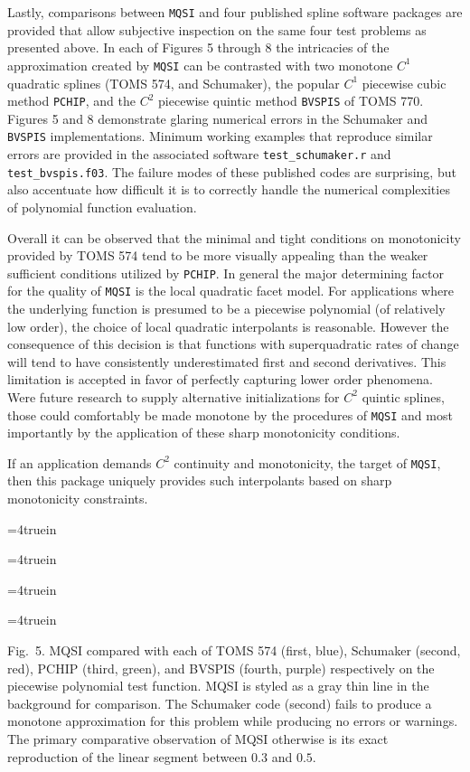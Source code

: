Lastly, comparisons between {\tt MQSI} and four published spline
software packages are provided that allow subjective inspection on the
same four test problems as presented above. In each of Figures 5
through 8 the intricacies of the approximation created by {\tt MQSI}
can be contrasted with two monotone $C^1$ quadratic splines (TOMS 574,
and Schumaker), the popular $C^1$ piecewise cubic method {\tt PCHIP},
and the $C^2$ piecewise quintic method {\tt BVSPIS} of TOMS
770. Figures 5 and 8 demonstrate glaring numerical errors in the
Schumaker and {\tt BVSPIS} implementations. Minimum working examples
that reproduce similar errors are provided in the associated software
{\tt test\_schumaker.r} and {\tt test\_bvspis.f03}. The failure modes
of these published codes are surprising, but also accentuate how
difficult it is to correctly handle the numerical complexities of
polynomial function evaluation.

Overall it can be observed that the minimal and tight conditions on
monotonicity provided by TOMS 574 tend to be more visually appealing
than the weaker sufficient conditions utilized by {\tt PCHIP}. In
general the major determining factor for the quality of {\tt MQSI} is
the local quadratic facet model. For applications where the underlying
function is presumed to be a piecewise polynomial (of relatively low
order), the choice of local quadratic interpolants is
reasonable. However the consequence of this decision is that functions
with superquadratic rates of change will tend to have consistently
underestimated first and second derivatives. This limitation is
accepted in favor of perfectly capturing lower order phenomena. Were
future research to supply alternative initializations for $C^2$
quintic splines, those could comfortably be made monotone by the
procedures of {\tt MQSI} and most importantly by the application of
these sharp monotonicity conditions.

If an application demands $C^2$ continuity and monotonicity, the
target of {\tt MQSI}, then this package uniquely provides such
interpolants based on sharp monotonicity constraints.

\goodbreak

\topinsert
\centerline{\epsfxsize=4truein }
\centerline{\epsfxsize=4truein }
\centerline{\epsfxsize=4truein }
\centerline{\epsfxsize=4truein }
{\narrower\noindent\rmVIII Fig.\ 5.
{\ttVIII MQSI} compared with each of TOMS 574 (first, blue), Schumaker
(second, red), {\ttVIII PCHIP} (third, green), and {\ttVIII BVSPIS}
(fourth, purple) respectively on the {\itVIII piecewise polynomial}
test function. {\ttVIII MQSI} is styled as a gray thin line in the
background for comparison. The Schumaker code (second) fails to
produce a monotone approximation for this problem while producing no
errors or warnings. The primary comparative observation of {\ttVIII
  MQSI} otherwise is its exact reproduction of the linear segment
between $0.3$ and $0.5$.
\par}
\endinsert

